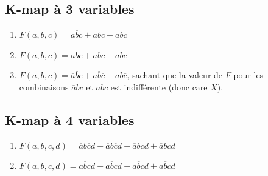 \documentclass[a4paper,11pt]{article}
\newif\ifsolutions
\begin{document}
\subsection{K-map à 3 variables}
\begin{enumerate}
    \item $F(a,b,c) = \overline{a}\overline{b}c + \overline{a}b\overline{c} + ab\overline{c}$
    \item $F(a,b,c) = \overline{a}b\overline{c} + \overline{a}bc + ab\overline{c}$
    \item $F(a,b,c) = \overline{a}\overline{b}c + a\overline{b}\overline{c} + ab\overline{c}$, sachant que la valeur de $F$ pour les combinaisons $\overline{a}bc$ et $abc$ est indifférente (donc care $X$).
\end{enumerate}

\ifsolutions
\begin{solbox}
\begin{enumerate}
    \item $F(a,b,c) = \overline{a}\overline{b}c + b\overline{c}$
    \item $F(a,b,c) = \overline{a}b + b\overline{c} = b(\overline{a} + \overline{c})$
    \item $F(a,b,c) = \overline{a}c + a\overline{c} = a \oplus c$ (en utilisant les cares pour former des groupes de 2 optimaux).
\end{enumerate}
\end{solbox}
\fi

\subsection{K-map à 4 variables}
\begin{enumerate}
    \item $F(a,b,c,d) = \overline{a}b\overline{c}\overline{d} + \overline{a}b\overline{c}d + \overline{a}bcd + \overline{a}bc\overline{d}$
    \item $F(a,b,c,d) = \overline{a}\overline{b}\overline{c}d + \overline{a}\overline{b}cd + a\overline{b}\overline{c}d + a\overline{b}cd$
\end{enumerate}

\ifsolutions
\begin{solbox}
\begin{enumerate}
    \item En factorisant ou via le tableau, on isole $a=0$ et $b=1$ : $\mathbf{F = \overline{a}b}$
    \item On isole $b=0$ et $d=1$ : $\mathbf{F = \overline{b}d}$
\end{enumerate}
\end{solbox}
\fi
\end{document}

